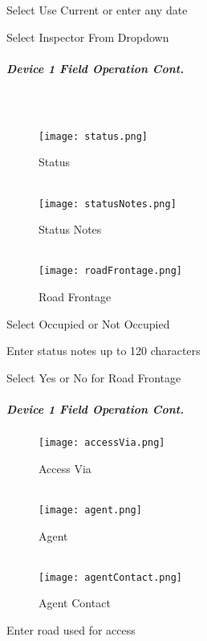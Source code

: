 \documentclass[class=article , crop=false, titlepage, twoside, multi={itemize, figure, verbatim}, float=false]{standalone}
\begin{document}
\noindent Select Use Current or enter any date\\
\vspace{2in}

\noindent Select Inspector From Dropdown\\

\clearpage
\subparagraph*{Device 1 Field Operation Cont.}
\subparagraph*{\\}
\begin{wrapfigure}{r}{0.5\textwidth}
\centering
\texttt{[image: status.png]}
\caption {Status}
\vspace{.2in}
\HRule \\[.4cm] %
\vspace{.2in}
\texttt{[image: statusNotes.png]}
\caption{Status Notes}
\vspace{.2in}
\HRule \\[.4cm] %
\vspace{.2in}
\texttt{[image: roadFrontage.png]}
\caption{Road Frontage}
\end{wrapfigure}
Select Occupied or Not Occupied\\
\vspace{2in}

\noindent Enter status notes up to 120 characters\\
\vspace{2in}

\noindent Select Yes or No for Road Frontage\\

\clearpage
\subparagraph*{Device 1 Field Operation Cont.}
\begin{wrapfigure}{r}{0.5\textwidth}
\centering
\texttt{[image: accessVia.png]}
\caption {Access Via}
\vspace{.2in}
\HRule \\[.4cm] %
\vspace{.2in}
\texttt{[image: agent.png]}
\caption{Agent}
\vspace{.2in}
\HRule \\[.4cm] %
\vspace{.2in}
\texttt{[image: agentContact.png]}
\caption{Agent Contact}
\end{wrapfigure}
Enter road used for access\\
\vspace{2in}
\end{document}
